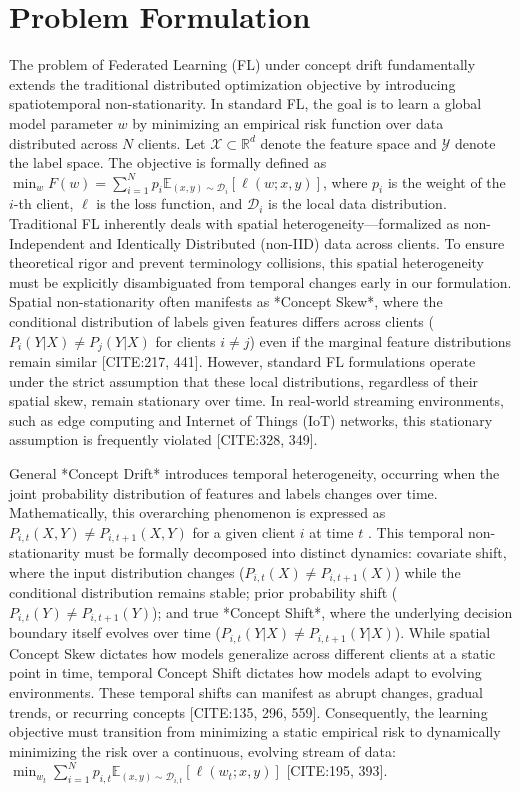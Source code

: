 \documentclass[journal]{IEEEtran}
\begin{document}
\section{Problem Formulation}
\label{sec:problem_formulation}

The problem of Federated Learning (FL) under concept drift fundamentally extends the traditional distributed optimization objective by introducing spatiotemporal non-stationarity. In standard FL, the goal is to learn a global model parameter $w$ by minimizing an empirical risk function over data distributed across $N$ clients. Let $\mathcal{X} \subset \mathbb{R}^d$ denote the feature space and $\mathcal{Y}$ denote the label space. The objective is formally defined as $\min_w F(w) = \sum_{i=1}^N p_i \mathbb{E}_{(x,y)\sim \mathcal{D}_i} [\ell(w; x, y)]$, where $p_i$ is the weight of the $i$-th client, $\ell$ is the loss function, and $\mathcal{D}_i$ is the local data distribution. Traditional FL inherently deals with spatial heterogeneity—formalized as non-Independent and Identically Distributed (non-IID) data across clients. To ensure theoretical rigor and prevent terminology collisions, this spatial heterogeneity must be explicitly disambiguated from temporal changes early in our formulation. Spatial non-stationarity often manifests as *Concept Skew*, where the conditional distribution of labels given features differs across clients ($P_i(Y|X) \neq P_j(Y|X)$ for clients $i \neq j$) even if the marginal feature distributions remain similar [CITE:217, 441]. However, standard FL formulations operate under the strict assumption that these local distributions, regardless of their spatial skew, remain stationary over time. In real-world streaming environments, such as edge computing and Internet of Things (IoT) networks, this stationary assumption is frequently violated [CITE:328, 349].

General *Concept Drift* introduces temporal heterogeneity, occurring when the joint probability distribution of features and labels changes over time. Mathematically, this overarching phenomenon is expressed as $P_{i,t}(X, Y) \neq P_{i,t+1}(X, Y)$ for a given client $i$ at time $t$ \cite{Hinder2024}. This temporal non-stationarity must be formally decomposed into distinct dynamics: covariate shift, where the input distribution changes ($P_{i,t}(X) \neq P_{i,t+1}(X)$) while the conditional distribution remains stable; prior probability shift ($P_{i,t}(Y) \neq P_{i,t+1}(Y)$); and true *Concept Shift*, where the underlying decision boundary itself evolves over time ($P_{i,t}(Y|X) \neq P_{i,t+1}(Y|X)$). While spatial Concept Skew dictates how models generalize across different clients at a static point in time, temporal Concept Shift dictates how models adapt to evolving environments. These temporal shifts can manifest as abrupt changes, gradual trends, or recurring concepts [CITE:135, 296, 559]. Consequently, the learning objective must transition from minimizing a static empirical risk to dynamically minimizing the risk over a continuous, evolving stream of data: $\min_{w_t} \sum_{i=1}^N p_{i,t} \mathbb{E}_{(x,y)\sim \mathcal{D}_{i,t}} [\ell(w_t; x, y)]$ [CITE:195, 393].
\end{document}
